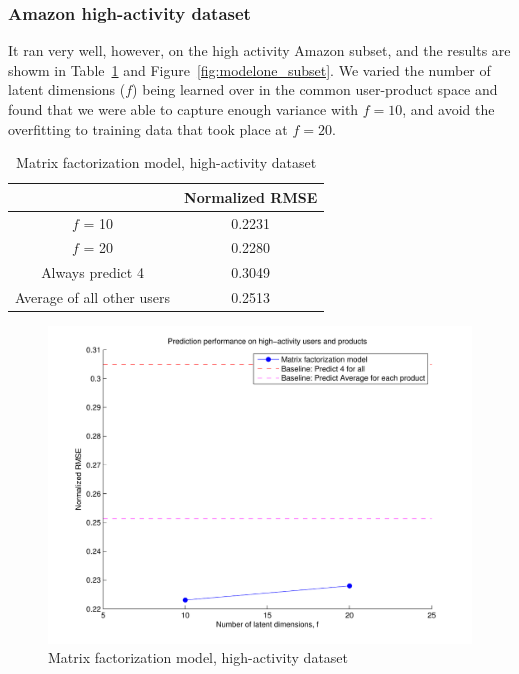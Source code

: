 \documentclass[letterpaper, 11 pt, conference]{ieeeconf}
\begin{document}
\subsubsection{Amazon high-activity dataset}
It ran very well, however, on the high activity Amazon subset, and the results are
showm in Table~\ref{table:modelthree_subset} and 
Figure~\ref{fig:modelone_subset}. We varied the number of latent dimensions ($f$)
being learned over in the common user-product space and found that we were able
to capture enough variance with $f = 10$, and avoid the overfitting to training
data that took place at $f = 20$.

\begin{table}[htb]
\centering
\begin{tabular}{|c|c|}
\cline{2-2}

\multicolumn{1}{c|}{} & {Normalized RMSE} \tabularnewline \hline
$f$ = 10 & 0.2231 \tabularnewline
$f$ = 20 & 0.2280 \tabularnewline
\hline
Always predict 4 & 0.3049 \tabularnewline 
Average of all other users & 0.2513 \tabularnewline
\hline
\end{tabular}
\caption{Matrix factorization model, high-activity dataset}
\label{table:modelthree_subset}
\end{table}

\begin{figure}[h]
\includegraphics[scale=0.6]{images/modelthree_subset.pdf}
\caption{Matrix factorization model, high-activity dataset}
\label{fig:modelthree_subset}
\end{figure}

\end{document}
